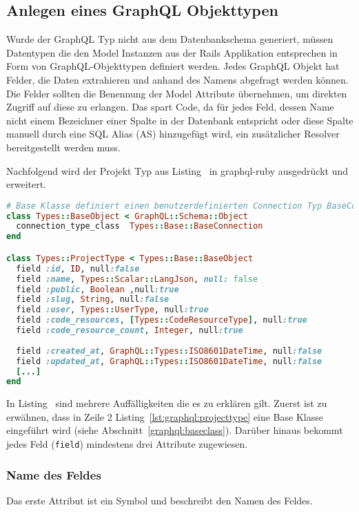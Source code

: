 \subsection{Anlegen eines GraphQL Objekttypen}
\label{impl:graphql:graphqltype}
\label{graphql:objecttype}
Wurde der GraphQL Typ nicht aus dem Datenbankschema generiert, müssen Datentypen die den Model Instanzen aus der Rails Applikation entsprechen in Form von GraphQL-Objekttypen definiert werden. 
Jedes GraphQL Objekt hat Felder, die Daten extrahieren und anhand des Namens abgefragt werden können. 
Die Felder sollten die Benennung der Model Attribute übernehmen, um direkten Zugriff auf diese zu erlangen. Das spart Code, da für jedes Feld, dessen Name nicht einem Bezeichner einer Spalte in der Datenbank entspricht oder diese Spalte manuell durch eine SQL Alias (AS) hinzugefügt wird, ein zusätzlicher Resolver bereitgestellt werden muss.

Nachfolgend wird der Projekt Typ aus Listing~ in graphql-ruby ausgedrückt und erweitert.

\begin{lstlisting}[language=Ruby,float=h!,caption={Definition des ProjectTypes zum Abbilden von Project Model Instanzen}, label={lst:graphql:projecttype}]
# Base Klasse definiert einen benutzerdefinierten Connection Typ BaseConnection 
class Types::BaseObject < GraphQL::Schema::Object
  connection_type_class  Types::Base::BaseConnection
end

class Types::ProjectType < Types::Base::BaseObject
  field :id, ID, null:false
  field :name, Types::Scalar::LangJson, null: false
  field :public, Boolean ,null:true
  field :slug, String, null:false
  field :user, Types::UserType, null:true
  field :code_resources, [Types::CodeResourceType], null:true
  field :code_resource_count, Integer, null:true
  
  field :created_at, GraphQL::Types::ISO8601DateTime, null:false
  field :updated_at, GraphQL::Types::ISO8601DateTime, null:false
  [...]
end
\end{lstlisting}

In Listing~ sind mehrere Auffälligkeiten die es zu erklären gilt.
Zuerst ist zu erwähnen, dass in Zeile 2 Listing~\ref{lst:graphql:projecttype} eine Base Klasse eingeführt wird (siehe Abschnitt~\ref{graphql:baseclass}).
Darüber hinaus bekommt jedes Feld (\lstinline|field|) mindestens drei Attribute zugewiesen. 

\subsubsection{Name des Feldes}
Das erste Attribut ist ein Symbol und beschreibt den Namen des Feldes. 

